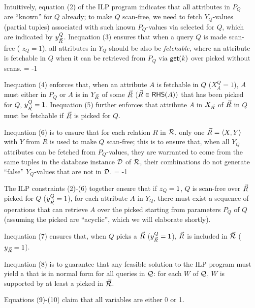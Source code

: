 {Intuitively, equation (2) of the ILP program indicates that all
attributes in $P_{Q}$ are ``known'' for $Q$ already; to make
$Q$ scan-free, we need to fetch $Y_{Q}$-values (partial tuples) associated
with such known $P_{Q}$-values via selected \bss for
$Q$, which are indicated by $y_{\vec{R}}^{Q}$.
Inequation (3) ensures that when a query $Q$ is made scan-free (\ie
$z_{Q} = 1$), all attributes in $Y_{Q}$ should be also be
{\em fetchable}, where an attribute is fetchable in $Q$
when it can be retrieved from $P_{Q}$ via $\protect\mathsf{get}(k)$ over picked
\bss without scans.
\looseness = -1

Inequation (4) enforces that, when an attribute $A$ is fetchable in
$Q$ (\ie $X_{A}^{Q} = 1$), $A$ must either in $P_{Q}$ or $A$ is
in $Y_{\vec{R}}$ of some \bs $\vec{R}$ ($\vec{R} \in {\ensuremath {\mathsf{RHS}}}(A))$
that has been picked for $Q$, \ie $y_{\vec{R}}^{Q} = 1$.
Inequation (5) further enforces that attribute $A$ in $X_{\vec{R}}$
of $\vec{R}$ in $Q$ must be fetchable if $\vec{R}$ is picked for $Q$.

Inequation (6) is to ensure that for each relation $R$ in ${\mathcal R}$,
only one \bs $\vec{R} \allowbreak =\allowbreak \langle X,\allowbreak Y\rangle$ with $Y$ from $R$ is used
to make $Q$ scan-free; this is to ensure that, when all $Y_{Q}$ attributes
can be fetched from $P_{Q}$-values, they are warranted to come from
the same tuples in the database instance $\mathcal D$ of ${\mathcal R}$, \ie their
combinations do not generate ``false'' $Y_{Q}$-values that are
not in $\mathcal D$.
\looseness = -1

The ILP constraints (2)-(6) together ensure that if $z_{Q}\allowbreak
=\allowbreak 1$, \ie $Q$ is scan-free over \bss $\vec{R}$ picked for $Q$
($y_{\vec{R}}^{Q}\allowbreak =\allowbreak 1$), for each attribute $A$ in $Y_{Q}$,
there must exist a sequence of \get operations that can retrieve
$A$ over the picked \bss starting from parameters $P_{Q}$ of $Q$
(assuming the picked \bss are ``acyclic'', which we will
elaborate shortly).


Inequation (7) ensures that, when $Q$ picks a \bs $\vec{R}$
($y_{\vec{R}}^{Q} = 1$), $\vec{R}$ is included in \bds $\vec{{\mathcal R}}$
($y_{\vec{R}} = 1$).

Inequation (8) is to guarantee that any feasible solution to the
ILP program must yield a \bds that is in normal form for all
queries in $\mathcal Q$: for each \qcs $W$ of $\mathcal Q$, $W$ is supported by
at least a \bs picked in $\vec{{\mathcal R}}$. 

Equations (9)-(10) claim that all variables are either 0 or 1.


}
